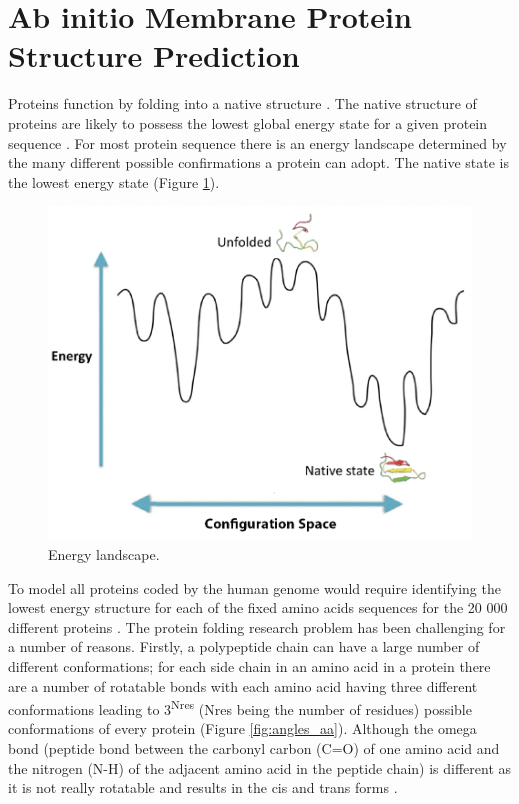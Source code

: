\section{Ab initio Membrane Protein Structure Prediction}
Proteins function by folding into a native structure \cite{baker2001protein}.  The native structure of proteins are likely to possess the lowest global energy state for a given protein sequence \cite{baker2001protein}.  For most protein sequence there is an energy landscape determined by the many different possible confirmations a protein can adopt.  The native state is the lowest energy state (Figure \ref{fig:landscape}). 
\begin{figure}[th!]
    \centering
    \includegraphics[width=\textwidth]{introduction/energy_landscape.png}
    \caption{Energy landscape.}
    \label{fig:landscape}
    \small
\end{figure}

To model all proteins coded by the human genome would require identifying the lowest energy structure for each of the fixed amino acids sequences for the 20 000 different proteins \cite{ponomarenko2016size}.  The protein folding research problem has been challenging for a number of reasons.  Firstly, a polypeptide chain can have a large number of different conformations; for each side chain in an amino acid in a protein there are a number of rotatable bonds with each amino acid having three different conformations leading to 3\textsuperscript{Nres} (Nres being the number of residues) possible conformations of every protein (Figure \ref{fig:angles_aa}).  Although the omega bond (peptide bond between the carbonyl carbon (C=O) of one amino acid and the nitrogen (N-H) of the adjacent amino acid in the peptide chain) is different as it is not really rotatable and results in the cis and trans forms \cite{craveur2013cis}.

